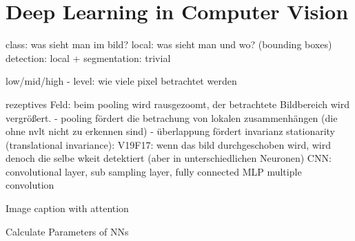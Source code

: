 \section{Deep Learning in Computer Vision}
\label{sect:deep-learning-in-computer-vison}
class: was sieht man im bild?
local: was sieht man und wo? (bounding boxes)
detection: local + 
segmentation: trivial

low/mid/high - level: wie viele pixel betrachtet werden

rezeptives Feld: beim pooling wird rausgezoomt, der betrachtete Bildbereich wird vergrößert.
- pooling fördert die betrachung von lokalen zusammenhängen (die ohne nvlt nicht zu erkennen sind)
- überlappung fördert invarianz
 stationarity (translational invariance): 
 	V19F17: wenn das bild durchgeschoben wird, wird denoch die selbe wkeit detektiert (aber in unterschiedlichen Neuronen)
CNN: convolutional layer, sub sampling layer, fully connected MLP
multiple convolution

Image caption with attention

Calculate Parameters of NNs
